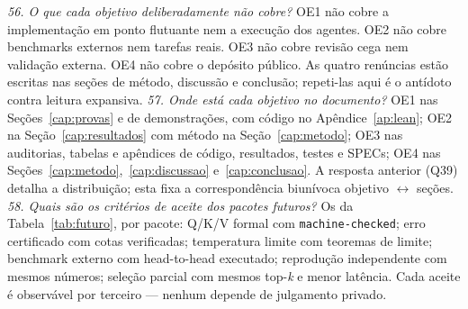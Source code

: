 \textit{56. O que cada objetivo deliberadamente não cobre?} OE1 não cobre a implementação em ponto flutuante nem a execução dos agentes. OE2 não cobre benchmarks externos nem tarefas reais. OE3 não cobre revisão cega nem validação externa. OE4 não cobre o depósito público. As quatro renúncias estão escritas nas seções de método, discussão e conclusão; repeti-las aqui é o antídoto contra leitura expansiva.
\textit{57. Onde está cada objetivo no documento?} OE1 nas Seções~\ref{cap:provas} e de demonstrações, com código no Apêndice~\ref{ap:lean}; OE2 na Seção~\ref{cap:resultados} com método na Seção~\ref{cap:metodo}; OE3 nas auditorias, tabelas e apêndices de código, resultados, testes e SPECs; OE4 nas Seções~\ref{cap:metodo},~\ref{cap:discussao} e~\ref{cap:conclusao}. A resposta anterior (Q39) detalha a distribuição; esta fixa a correspondência biunívoca objetivo $\leftrightarrow$ seções.
\textit{58. Quais são os critérios de aceite dos pacotes futuros?} Os da Tabela~\ref{tab:futuro}, por pacote: Q/K/V formal com \texttt{machine-checked}; erro certificado com cotas verificadas; temperatura limite com teoremas de limite; benchmark externo com head-to-head executado; reprodução independente com mesmos números; seleção parcial com mesmos top-\textit{k} e menor latência. Cada aceite é observável por terceiro --- nenhum depende de julgamento privado.
